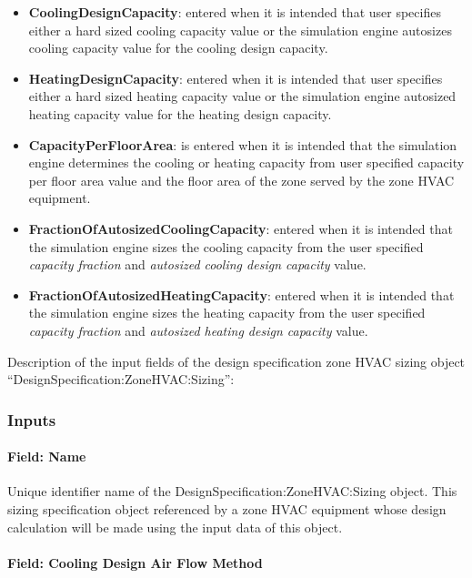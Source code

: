 \begin{itemize}
\item
  \textbf{CoolingDesignCapacity}: entered when it is intended that user specifies either a hard sized cooling capacity value or the simulation engine autosizes cooling capacity value for the cooling design capacity.
\item
  \textbf{HeatingDesignCapacity}: entered when it is intended that user specifies either a hard sized heating capacity value or the simulation engine autosized heating capacity value for the heating design capacity.
\item
  \textbf{CapacityPerFloorArea}: is entered when it is intended that the simulation engine determines the cooling or heating capacity from user specified capacity per floor area value and the floor area of the zone served by the zone HVAC equipment.
\item
  \textbf{FractionOfAutosizedCoolingCapacity}: entered when it is intended that the simulation engine sizes the cooling capacity from the user specified \emph{capacity fraction} and \emph{autosized cooling design capacity} value.
\item
  \textbf{FractionOfAutosizedHeatingCapacity}: entered when it is intended that the simulation engine sizes the heating capacity from the user specified \emph{capacity fraction} and \emph{autosized heating design capacity} value.
\end{itemize}

Description of the input fields of the design specification zone HVAC sizing object ``DesignSpecification:ZoneHVAC:Sizing'':

\subsubsection{Inputs}\label{inputs-5-007}

\paragraph{Field: Name}\label{designspecificationzonehvacsizing-field-name}

Unique identifier name of the DesignSpecification:ZoneHVAC:Sizing object. This sizing specification object referenced by a zone HVAC equipment whose design calculation will be made using the input data of this object.

\paragraph{Field: Cooling Design Air Flow Method}\label{field-cooling-design-air-flow-method-1}

